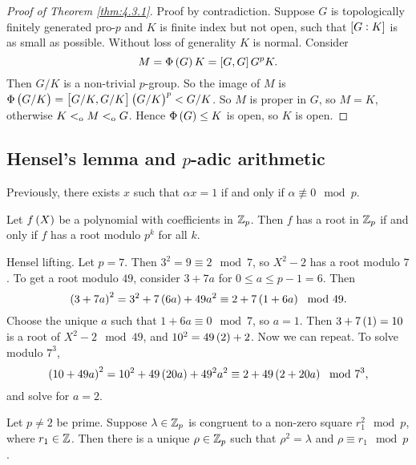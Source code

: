 \begin{proof}[Proof of Theorem \ref{thm:4.3.1}]
Proof by contradiction. Suppose $ G $ is topologically finitely generated pro-$ p $ and $ K $ is finite index but not open, such that $ \sbr{G : K} $ is as small as possible. Without loss of generality $ K $ is normal. Consider
$$ M = \Phi\br{G}K = \sbr{G, G}G^pK. $$
Then $ G / K $ is a non-trivial $ p $-group. So the image of $ M $ is $ \Phi\br{G / K} = \sbr{G / K, G / K}\br{G / K}^p < G / K $. So $ M $ is proper in $ G $, so $ M = K $, otherwise $ K <_{\mathrm{o}} M <_{\mathrm{o}} G $. Hence $ \Phi\br{G} \le K $ is open, so $ K $ is open.
\end{proof}

\pagebreak

\subsection{Hensel's lemma and \texorpdfstring{$ p $}{p}-adic arithmetic}


Previously, there exists $ x $ such that $ \alpha x = 1 $ if and only if $ \alpha \not\equiv 0 \mod p $.

\begin{lemma}
Let $ f\br{X} $ be a polynomial with coefficients in $ \mathbb{Z}_p $. Then $ f $ has a root in $ \mathbb{Z}_p $ if and only if $ f $ has a root modulo $ p^k $ for all $ k $.
\end{lemma}

\begin{example}
Hensel lifting. Let $ p = 7 $. Then $ 3^2 = 9 \equiv 2 \mod 7 $, so $ X^2 - 2 $ has a root modulo $ 7 $. To get a root modulo $ 49 $, consider $ 3 + 7a $ for $ 0 \le a \le p - 1 = 6 $. Then
$$ \br{3 + 7a}^2 = 3^2 + 7\br{6a} + 49a^2 \equiv 2 + 7\br{1 + 6a} \mod 49. $$
Choose the unique $ a $ such that $ 1 + 6a \equiv 0 \mod 7 $, so $ a = 1 $. Then $ 3 + 7\br{1} = 10 $ is a root of $ X^2 - 2 \mod 49 $, and $ 10^2 = 49\br{2} + 2 $. Now we can repeat. To solve modulo $ 7^3 $,
$$ \br{10 + 49a}^2 = 10^2 + 49\br{20a} + 49^2a^2 \equiv 2 + 49\br{2 + 20a} \mod 7^3, $$
and solve for $ a = 2 $.
\end{example}

\begin{proposition}
Let $ p \ne 2 $ be prime. Suppose $ \lambda \in \mathbb{Z}_p $ is congruent to a non-zero square $ r_1^2 \mod p $, where $ r_1 \in \mathbb{Z} $. Then there is a unique $ \rho \in \mathbb{Z}_p $ such that $ \rho^2 = \lambda $ and $ \rho \equiv r_1 \mod p $.
\end{proposition}

